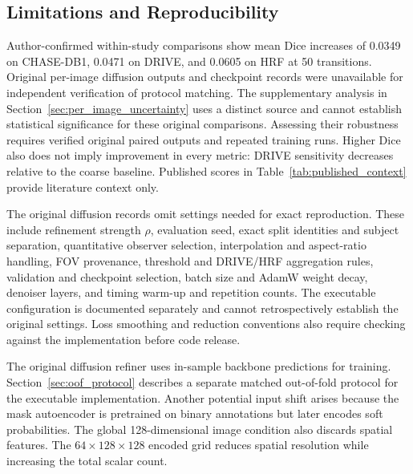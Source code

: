 \documentclass[jimaging,article,submit,pdftex,moreauthors]{Definitions/mdpi}%
\begin{document}
\subsection{Limitations and Reproducibility}

\label{sec:limitations}



Author-confirmed within-study comparisons show mean Dice increases of 0.0349 on CHASE-DB1, 0.0471 on DRIVE, and 0.0605 on HRF at 50 transitions. Original per-image diffusion outputs and checkpoint records were unavailable for independent verification of protocol matching. The supplementary analysis in Section~\ref{sec:per_image_uncertainty} uses a distinct source and cannot establish statistical significance for these original comparisons. Assessing their robustness requires verified original paired outputs and repeated training runs. Higher Dice also does not imply improvement in every metric: DRIVE sensitivity decreases relative to the coarse baseline. Published scores in Table~\ref{tab:published_context} provide literature context only.



The original diffusion records omit settings needed for exact reproduction. These include refinement strength $\rho$, evaluation seed, exact split identities and subject separation, quantitative observer selection, interpolation and aspect-ratio handling, FOV provenance, threshold and DRIVE/HRF aggregation rules, validation and checkpoint selection, batch size and AdamW weight decay, denoiser layers, and timing warm-up and repetition counts. The executable configuration is documented separately and cannot retrospectively establish the original settings. Loss smoothing and reduction conventions also require checking against the implementation before code release.



The original diffusion refiner uses in-sample backbone predictions for training. Section~\ref{sec:oof_protocol} describes a separate matched out-of-fold protocol for the executable implementation. Another potential input shift arises because the mask autoencoder is pretrained on binary annotations but later encodes soft probabilities. The global 128-dimensional image condition also discards spatial features. The $64\times128\times128$ encoded grid reduces spatial resolution while increasing the total scalar count.
\end{document}
